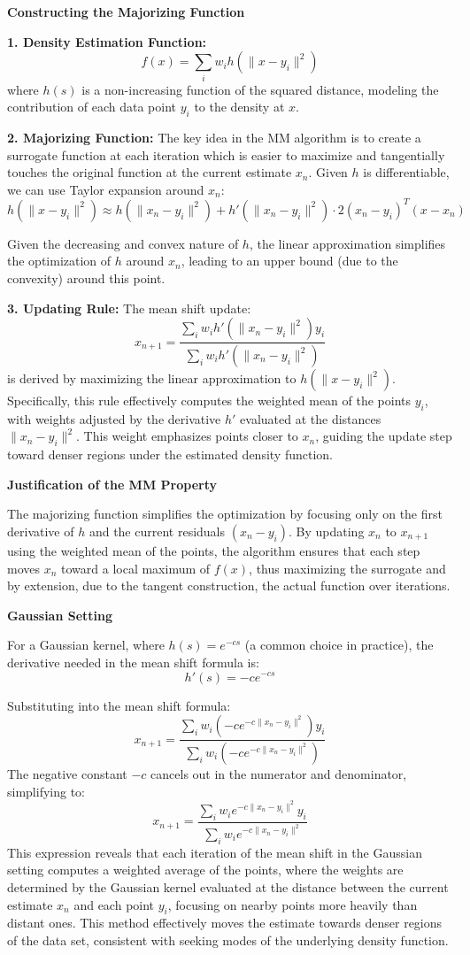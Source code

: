 \documentclass[8pt]{article}
\begin{document}
{\textbf{Constructing the Majorizing Function}

\textbf{1. Density Estimation Function:}
   \[
   f(x) = \sum_i w_i h(\|x - y_i\|^2)
   \]
   where \(h(s)\) is a non-increasing function of the squared distance, modeling the contribution of each data point \(y_i\) to the density at \(x\).

\textbf{2. Majorizing Function:}
   The key idea in the MM algorithm is to create a surrogate function at each iteration which is easier to maximize and tangentially touches the original function at the current estimate \(x_n\). Given \(h\) is differentiable, we can use Taylor expansion around \(x_n\):
   \[
   h(\|x - y_i\|^2) \approx h(\|x_n - y_i\|^2) + h'(\|x_n - y_i\|^2) \cdot 2(x_n - y_i)^T (x - x_n)
   \]

   Given the decreasing and convex nature of \(h\), the linear approximation simplifies the optimization of \(h\) around \(x_n\), leading to an upper bound (due to the convexity) around this point.

\textbf{3. Updating Rule:}
   The mean shift update:
   \[
   x_{n+1} = \frac{\sum_i w_i h'(\|x_n - y_i\|^2) y_i}{\sum_i w_i h'(\|x_n - y_i\|^2)}
   \]
   is derived by maximizing the linear approximation to \(h(\|x - y_i\|^2)\). Specifically, this rule effectively computes the weighted mean of the points \(y_i\), with weights adjusted by the derivative \(h'\) evaluated at the distances \(\|x_n - y_i\|^2\). This weight emphasizes points closer to \(x_n\), guiding the update step toward denser regions under the estimated density function.

\textbf{Justification of the MM Property}

The majorizing function simplifies the optimization by focusing only on the first derivative of \(h\) and the current residuals \((x_n - y_i)\). By updating \(x_n\) to \(x_{n+1}\) using the weighted mean of the points, the algorithm ensures that each step moves \(x_n\) toward a local maximum of \(f(x)\), thus maximizing the surrogate and by extension, due to the tangent construction, the actual function over iterations.

\textbf{Gaussian Setting}

For a Gaussian kernel, where \( h(s) = e^{-cs} \) (a common choice in practice), the derivative needed in the mean shift formula is:
\[
h'(s) = -c e^{-cs}
\]

Substituting into the mean shift formula:
\[
x_{n+1} = \frac{\sum_i w_i (-c e^{-c\|x_n - y_i\|^2}) y_i}{\sum_i w_i (-c e^{-c\|x_n - y_i\|^2})}
\]
The negative constant \( -c \) cancels out in the numerator and denominator, simplifying to:
\[
x_{n+1} = \frac{\sum_i w_i e^{-c\|x_n - y_i\|^2} y_i}{\sum_i w_i e^{-c\|x_n - y_i\|^2}}
\]
This expression reveals that each iteration of the mean shift in the Gaussian setting computes a weighted average of the points, where the weights are determined by the Gaussian kernel evaluated at the distance between the current estimate \(x_n\) and each point \(y_i\), focusing on nearby points more heavily than distant ones. This method effectively moves the estimate towards denser regions of the data set, consistent with seeking modes of the underlying density function.

}
\end{document}

